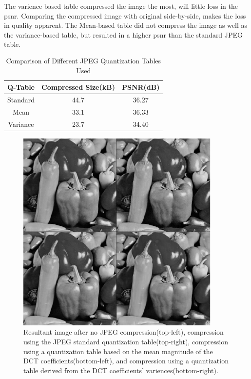 \documentclass{article}
\begin{document}
The varience based table compressed the image the most, will little loss in the psnr.
Comparing the compressed image with original side-by-side, makes the loss in quality
apparent. The Mean-based table did not compress the image as well as the variance-based
table, but resulted in a higher psnr than the standard JPEG table.


\begin{table}[H]
\centering
\begin{tabular}{ |c|c|c| } 
 \hline
 Q-Table & Compressed Size(kB) & PSNR(dB) \\ 
 \hline
 Standard 	& 44.7 & 36.27 \\ 
 Mean 		& 33.1 & 36.33 \\ 
 Variance 	& 23.7 & 34.40 \\ 
 \hline
\end{tabular}
\caption{Comparison of Different JPEG Quantization Tables Used}
\label{snrTab}
\end{table}
   
\begin{figure}[H]
\centering
\includegraphics [width=4in]{lab2_03.eps}
\caption{Resultant image after no JPEG compression(top-left),
compression using the JPEG standard quantization table(top-right),
compression using a quantization table based on the mean magnitude of the DCT coefficients(bottom-left), and
compression using a quantization table derived from the DCT coefficients' variences(bottom-right).}
\label{jpgTables}
\end{figure}
\end{document}
